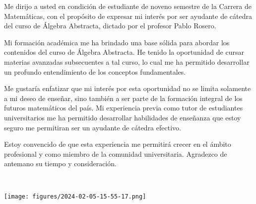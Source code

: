 \documentclass[11pt,a4paper,sans]{moderncv}        %
\begin{document}
Me dirijo a usted en condición de estudiante de noveno semestre de la Carrera de Matemáticas, con el propósito de expresar mi interés por ser ayudante de cátedra del curso de Álgebra Abstracta, dictado por el profesor Pablo Rosero.


Mi formación académica  me ha brindado una base sólida para abordar los contenidos del curso de Álgebra Abstracta. He tenido la oportunidad de cursar materias avanzadas subsecuentes a tal curso, lo cual me ha permitido desarrollar un profundo entendimiento de los conceptos fundamentales.


Me gustaría enfatizar que mi interés por esta oportunidad no se limita solamente a mi deseo de enseñar, sino también a ser parte de la formación integral de los futuros matemáticos del país. Mi experiencia previa como tutor de estudiantes universitarios me ha permitido desarrollar habilidades de  enseñanza que estoy seguro me permitiran ser un ayudante de cátedra efectivo.


Estoy convencido de que esta experiencia me permitirá crecer en el ámbito profesional y como  miembro de la comunidad universitaria.
Agradezco de antemano su tiempo y consideración.


~


\makeletterclosing

\texttt{[image: figures/2024-02-05-15-55-17.png]}


 
\end{document}
